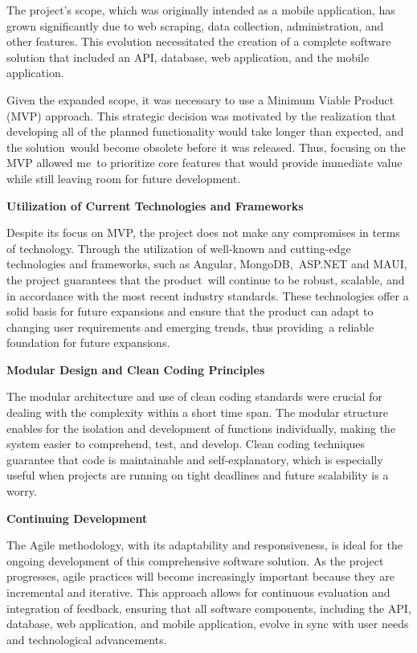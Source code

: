 The project's scope, which was originally intended as a mobile application, has grown significantly due to web scraping, data collection, administration, and other features. This evolution necessitated the creation of a complete software solution that included an API, database, web application, and the mobile application. 

Given the expanded scope, it was necessary to use a Minimum Viable Product (MVP) approach. This strategic decision was motivated by the realization that developing all of the planned functionality would take longer than expected, and the solution would become obsolete before it was released. Thus, focusing on the MVP allowed me to prioritize core features that would provide immediate value while still leaving room for future development.

\noindent\textbf{Utilization of Current Technologies and Frameworks}

Despite its focus on MVP, the project does not make any compromises in terms of technology. Through the utilization of well-known and cutting-edge technologies and frameworks, such as Angular, MongoDB, ASP.NET and MAUI, the project guarantees that the product will continue to be robust, scalable, and in accordance with the most recent industry standards. These technologies offer a solid basis for future expansions and ensure that the product can adapt to changing user requirements and emerging trends, thus providing a reliable foundation for future expansions.

\noindent\textbf{Modular Design and Clean Coding Principles}

The modular architecture and use of clean coding standards were crucial for dealing with the complexity within a short time span. The modular structure enables for the isolation and development of functions individually, making the system easier to comprehend, test, and develop. Clean coding techniques guarantee that code is maintainable and self-explanatory, which is especially useful when projects are running on tight deadlines and future scalability is a worry. \cite{cleancode}

\noindent\textbf{Continuing Development}

The Agile methodology, with its adaptability and responsiveness, is ideal for the ongoing development of this comprehensive software solution. As the project progresses, agile practices will become increasingly important because they are incremental and iterative. This approach allows for continuous evaluation and integration of feedback, ensuring that all software components, including the API, database, web application, and mobile application, evolve in sync with user needs and technological advancements. \cite{agile}

